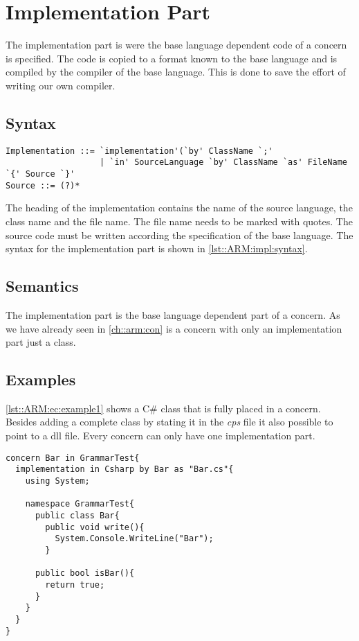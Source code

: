 \chapter{Implementation Part} \label{chapter:implementation}
The implementation part is were the base language dependent code of a concern is specified. The code
is copied to a format known to the base language and is compiled by the compiler of the base language. This
is done to save the effort of writing our own compiler.

\section*{Syntax}
\begin{lstlisting}[caption = {Implementation syntax}, label = lst::ARM:impl:syntax,
style = listing, language = ebnf, float = tpb]
Implementation ::= `implementation'(`by' ClassName `;'
                   | `in' SourceLanguage `by' ClassName `as' FileName `{' Source `}'
Source ::= (?)*
\end{lstlisting}
The heading of the implementation contains the name of the source language, the class name and the file name.
The file name needs to be marked with quotes.
The source code must be written according the specification of the base language. The \Compose* syntax for
the implementation part is shown in \autoref{lst::ARM:impl:syntax}.

\section*{Semantics}
The implementation part is the base language dependent part of a concern. As we have already seen in \autoref{ch::arm:con}
is a concern with only an implementation part just a class.

\section*{Examples}
\autoref{lst::ARM:ec:example1} shows a C\# class that is fully placed in a concern.
Besides adding a complete class by stating it in the \emph{cps} file it also possible to point to a dll file.
Every concern can only have one implementation part.

\begin{lstlisting}[caption={The class Bar as concern},label=lst::ARM:ec:example1, style=listing,language=ComposeStar,float = tpb]
concern Bar in GrammarTest{
  implementation in Csharp by Bar as "Bar.cs"{
    using System;
    
    namespace GrammarTest{
      public class Bar{
        public void write(){
          System.Console.WriteLine("Bar");
        }

      public bool isBar(){
        return true;
      }
    }
  }
}
\end{lstlisting}

